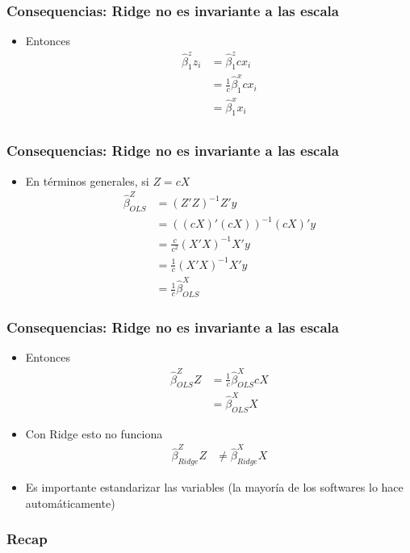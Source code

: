 \documentclass[
  shownotes,
  xcolor={svgnames},
  hyperref={colorlinks,citecolor=DarkBlue,linkcolor=andesred,urlcolor=DarkBlue}
  , aspectratio=169]{beamer}
\begin{document}
\begin{frame}[fragile]
\frametitle{Consequencias: Ridge no es invariante a las escala}
\begin{itemize}
  \item Entonces
  \begin{align}
  \hat{\beta}^z_{1}z_i &=\hat{\beta}^z_{1}cx_i \\
  &=\frac{1}{c}\hat{\beta}^x_1cx_i \\
  &=\hat{\beta}^x_1 x_i \\
  \end{align}
  
  
\end{itemize}
\end{frame}
\begin{frame}[fragile]
\frametitle{Consequencias: Ridge no es invariante a las escala}
\begin{itemize}
  
  \item En términos generales, si $Z=cX$
  \begin{align*}
    \hat{\beta}^Z_{OLS}  &= (Z'Z)^{-1} Z' y \\
                         &= ((cX)'(cX))^{-1} (cX)' y \\
                         &= \frac{c}{c^2}(X'X)^{-1} X' y \\
                         &= \frac{1}{c}(X'X)^{-1} X' y  \\
                         &= \frac{1}{c} \hat{\beta}^X_{OLS}
  \end{align*} 
\end{itemize}

  \end{frame}
\begin{frame}[fragile]
\frametitle{Consequencias: Ridge no es invariante a las escala}
\begin{itemize}
  \item Entonces
  \begin{align*}
  \hat{\beta}^Z_{OLS} Z  &=  \frac{1}{c} \hat{\beta}^X_{OLS} cX \\
                         &= \hat{\beta}^X_{OLS} X
  \end{align*} 
\medskip
  \item Con Ridge esto no funciona
    \begin{align*}
  \hat{\beta}^Z_{Ridge} Z &\neq  \hat{\beta}^X_{Ridge} X
  \end{align*} 

\item Es importante estandarizar las variables (la mayoría de los softwares lo hace automáticamente)
\end{itemize}


\end{frame}

\begin{frame}[fragile]
\frametitle{Recap}


 \end{frame}


\end{document}
